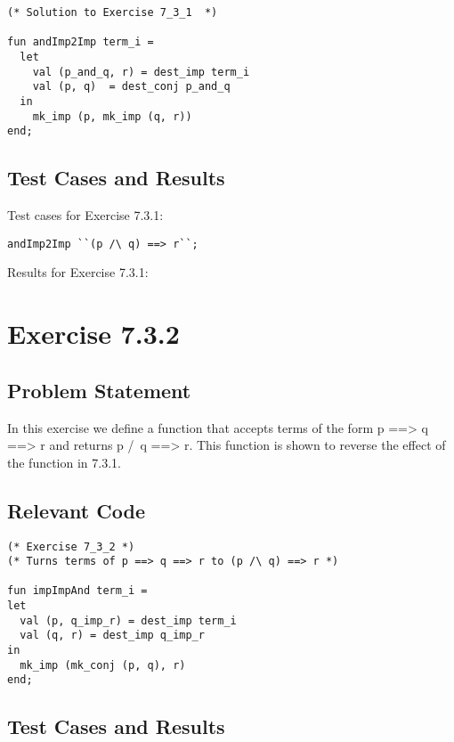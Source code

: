 \documentclass[letterpaper]{report}
\begin{document}
\begin{lstlisting}
(* Solution to Exercise 7_3_1  *)

fun andImp2Imp term_i =
  let
    val (p_and_q, r) = dest_imp term_i
    val (p, q)  = dest_conj p_and_q
  in
    mk_imp (p, mk_imp (q, r))
end;
\end{lstlisting}


\section{Test Cases and Results}
\label{sec:tests}
\setcounter{sessioncount}{0}

\vspace{12px}
\indent Test cases for Exercise 7.3.1:
\begin{lstlisting}
andImp2Imp ``(p /\ q) ==> r``;
\end{lstlisting}


Results for Exercise 7.3.1:





\newpage


\chapter{Exercise 7.3.2}
\label{sec:ex-7-3-2}

\section{Problem Statement}
In this exercise we define a function that accepts terms of the form p ==> q ==> r and returns p /\ q ==> r. This function
is shown to reverse the effect of the function in 7.3.1.    


\section{Relevant Code}

\begin{lstlisting}
(* Exercise 7_3_2 *)
(* Turns terms of p ==> q ==> r to (p /\ q) ==> r *)

fun impImpAnd term_i =
let
  val (p, q_imp_r) = dest_imp term_i
  val (q, r) = dest_imp q_imp_r
in
  mk_imp (mk_conj (p, q), r)
end;

\end{lstlisting}

\section{Test Cases and Results}
\end{document}

